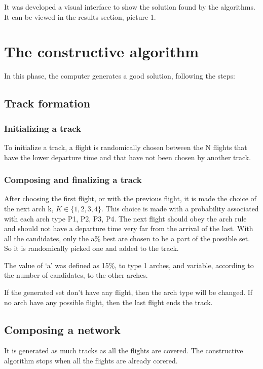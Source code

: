 \documentclass{endm}
\begin{document}
It was developed a visual interface to show the solution found by the algorithms. It can be viewed in the results section, picture 1.

\section{The constructive algorithm}

In this phase, the computer generates a good solution, following the steps:

\subsection{Track formation}
\subsubsection{ Initializing a track }

To initialize a track, a flight is randomically chosen between the N flights that have the lower departure time and that have not been chosen by another track.

\subsubsection{ Composing and finalizing a track }

After choosing the first flight, or with the previous flight, it is made the choice of the next arch k,  $ K \in \{ 1, 2, 3, 4 \} $. This choice is made with a probability associated with each arch type P1, P2, P3, P4. The next flight should obey the arch rule and should not have a departure time very far from the arrival of the last. With all the candidates, only the a\% best are chosen to be a part of the possible set. So it is randomically picked one and added to the track.

The value of ‘a’ was defined as 15\%, to type 1 arches, and variable, according to the number of candidates, to the other arches.

If the generated set don’t have any flight, then the arch type will be changed. If no arch have any possible flight, then the last flight ends the track.

\subsection{ Composing a network }

It is generated as much tracks as all the flights are covered. The constructive algorithm stops when all the flights are already corered.	
\end{document}
